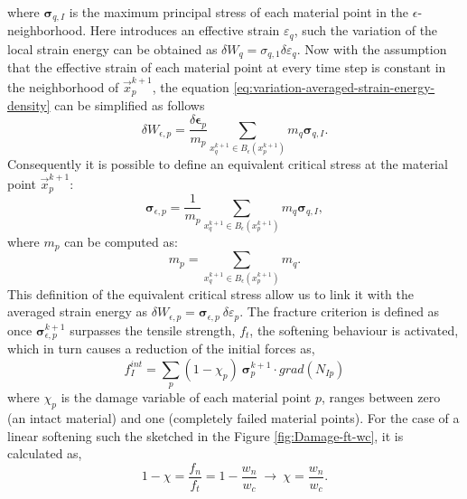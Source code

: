 \documentclass[preprint,12pt,a4paper]{elsarticle}
\newcommand{\tens}[1]{
  \ensuremath{\mathbf{{#1}}}
}
\newcommand\Grad[1]{grad({#1})}
\begin{document}
where $\tens{\sigma}_{q,I}$ is the maximum principal stress of each
material point in the $\epsilon$-neighborhood. Here
\cite{Navas_2017_ES} introduces an effective strain $\varepsilon_q$,
such the variation of the local strain energy can be obtained as
$\delta W_q = \sigma_{q,1} \delta\varepsilon_q$. Now with the assumption
that the effective strain of each material point at every time step
is constant in the neighborhood of $\vec{x}_p^{k+1}$, the equation
\eqref{eq:variation-averaged-strain-energy-density} can be simplified
as follows
\begin{equation}
  \label{eq:variation-averaged-strain-energy-density-simpli}
  \delta W_{\epsilon,p} =
  \frac{\delta \tens{\epsilon}_p}{m_p} \sum_{x_q^{k+1} \in
  B_{\epsilon}(x_p^{k+1})} m_q \tens{\sigma}_{q,I}. 
\end{equation}
Consequently it is possible to define an equivalent critical stress at the
material point $\vec{x}_p^{k+1}$:
\begin{equation}
  \label{eq:equivalent-critical-stress}
  \tens{\sigma}_{\epsilon,p} =
  \frac{1}{m_p} \sum_{x_q^{k+1} \in
  B_{\epsilon}(x_p^{k+1})} m_q \tens{\sigma}_{q,I}, 
\end{equation}
where $m_p$ can be computed as:
\begin{equation}
  \label{eq:averaged-mass}
  m_p = \sum_{x_q^{k+1} \in B_{\epsilon}(x_p^{k+1})} m_q.
\end{equation}
This definition of the equivalent critical stress allow us to
link it with the averaged strain energy as $\delta W_{\epsilon,p} =
 \tens{\sigma}_{\epsilon,p}\ \delta\varepsilon_p$. The fracture
criterion is defined as once $\tens{\sigma}_{\epsilon,p}^{k+1}$
surpasses the tensile strength, $f_t$, the softening behaviour is
activated, which in turn causes a reduction of the initial forces as,
 \begin{equation}
   \label{eq:f-int-damaged}
   f^{int}_I = \sum_p (1 - \chi_p)\ \tens{\sigma}_{p}^{k+1} \cdot \Grad{N_{Ip}}
 \end{equation}
where $\chi_p$ is the damage variable of each material point $p$,
ranges between zero (an intact material) and one (completely failed
material points). For the case of a linear softening such the sketched
in the Figure \ref{fig:Damage-ft-wc}, it is calculated as,
 \begin{equation}
   \label{eq:damaged-variable-chi}
   1 - \chi = \frac{f_n}{f_t} = 1 - \frac{w_n}{w_c}\ \rightarrow\ \chi
   = \frac{w_n}{w_c}.
 \end{equation}
 
\end{document}
